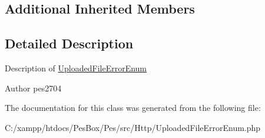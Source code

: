 \subsection*{Additional Inherited Members}


\subsection{Detailed Description}
Description of \mbox{\hyperlink{class_pes_1_1_http_1_1_uploaded_file_error_enum}{Uploaded\+File\+Error\+Enum}}

\begin{DoxyAuthor}{Author}
pes2704 
\end{DoxyAuthor}


The documentation for this class was generated from the following file\+:\begin{DoxyCompactItemize}
\item 
C\+:/xampp/htdocs/\+Pes\+Box/\+Pes/src/\+Http/Uploaded\+File\+Error\+Enum.\+php\end{DoxyCompactItemize}
